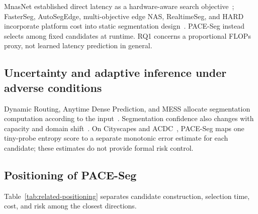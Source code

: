 \documentclass[a4paper,review,12pt]{elsarticle}
\newcommand{\method}{PACE-Seg}
\begin{document}
MnasNet established direct latency as a hardware-aware search objective~\cite{tan2019mnasnet}; FasterSeg, AutoSegEdge, multi-objective edge NAS, RealtimeSeg, and HARD incorporate platform cost into static segmentation design~\cite{chen2020fasterseg,dou2023autosegedge,dou2024multiobjective,li2023realtimeseg,kwon2024hard}. \method{} instead selects among fixed candidates at runtime. RQ1 concerns a proportional FLOPs proxy, not learned latency prediction in general.

\subsection{Uncertainty and adaptive inference under adverse conditions}

Dynamic Routing, Anytime Dense Prediction, and MESS allocate segmentation computation according to the input~\cite{li2020dynamic,liu2022anytime,kouris2022mess}. Segmentation confidence also changes with capacity and domain shift~\cite{wang2023calibrating,dejorge2023reliability}. On Cityscapes and ACDC~\cite{sakaridis2021acdc}, \method{} maps one tiny-probe entropy score to a separate monotonic error estimate for each candidate; these estimates do not provide formal risk control.

\subsection{Positioning of PACE-Seg}

Table~\ref{tab:related-positioning} separates candidate construction, selection time, cost, and risk among the closest directions.
\end{document}
